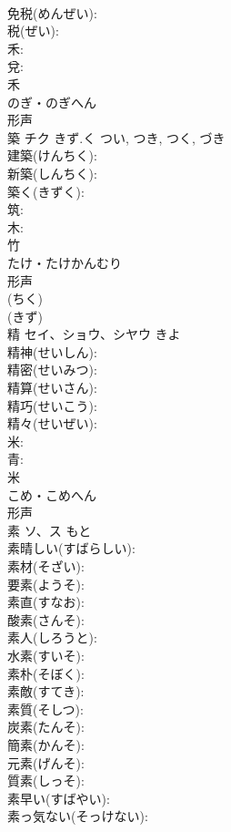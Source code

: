 \documentclass[8pt]{extreport}
\begin{document}
\begin{CJK}{UTF8}{min}
\\	免税(めんぜい): 
\\	税(ぜい): 
\\	禾: 
\\	兌: 
\\	禾	
\\	のぎ・のぎへん	
\\	形声 
\\	築	チク	きず.く	つい, つき, つく, づき	
\\	建築(けんちく): 
\\	新築(しんちく): 
\\	築く(きずく): 
\\	筑: 
\\	木: 
\\	竹	
\\	たけ・たけかんむり	
\\	形声 
\\	(ちく) 
\\	(きず) 
\\	精	セイ、ショウ、シヤウ		きよ	
\\	精神(せいしん): 
\\	精密(せいみつ): 
\\	精算(せいさん): 
\\	精巧(せいこう): 
\\	精々(せいぜい): 
\\	米: 
\\	青: 
\\	米	
\\	こめ・こめへん	
\\	形声 
\\	素	ソ、ス	もと		
\\	素晴しい(すばらしい): 
\\	素材(そざい): 
\\	要素(ようそ): 
\\	素直(すなお): 
\\	酸素(さんそ): 
\\	素人(しろうと): 
\\	水素(すいそ): 
\\	素朴(そぼく): 
\\	素敵(すてき): 
\\	素質(そしつ): 
\\	炭素(たんそ): 
\\	簡素(かんそ): 
\\	元素(げんそ): 
\\	質素(しっそ): 
\\	素早い(すばやい): 
\\	素っ気ない(そっけない): 

\end{CJK}
\end{document}
